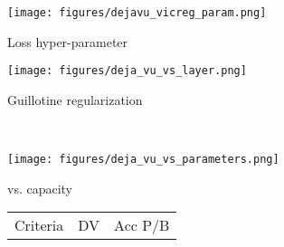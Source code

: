 \begin{figure}[ht]
\label{fig:mitigations}
\begin{minipage}[t]{0.5\textwidth}
\centering
     \begin{subfigure}[b]{0.47\textwidth}
         \centering
         \texttt{[image: figures/dejavu\_vicreg\_param.png]}
         \vspace{-1.5em}
         \caption{Loss hyper-parameter}
         \label{fig:dejavu v. invariance}
     \end{subfigure}
     \begin{subfigure}[b]{0.49\textwidth}
         \centering
         \texttt{[image: figures/deja\_vu\_vs\_layer.png]}
         \vspace{-1.5em}
         \caption{Guillotine regularization}
         \label{fig:dejavu v. guillotine}
     \end{subfigure}~
     \vspace{-0.5em}
    \caption{
    Effect of two kinds of hyper-parameters on VICReg memorization. \textbf{Left:} \dejavu score (red) versus the \emph{invariance} loss parameter, $\lambda$, used in the VICReg criterion (100k dataset). Larger $\lambda$ significantly reduces \dejavu, with minimal effect on linear probe validation performance (green). $\lambda = 25$ (near maximum \dejavu) is recommended in the original paper \textbf{Right:} \dejavu score versus projector layer---guillotine regularization \cite{Guillotine}---from projector to backbone. Removing the projector can significantly reduce \dejavu. Appendix \ref{sec:guillotine} shows that the backbone still can memorize, however; we demonstrate reconstructions using the SimCLR backbone.
    }
\end{minipage}
\hfill
\begin{minipage}[t]{0.48\textwidth}
\centering
     \begin{subfigure}[b]{0.46\textwidth}
         \centering
         \texttt{[image: figures/deja\_vu\_vs\_parameters.png]}
         \vspace{-1.3em}
         \caption{\dejavu vs. capacity}
         \label{fig:dejavu v. capacity}
     \end{subfigure}
     \hfill
     \begin{subfigure}[b]{0.52\textwidth}
          \tiny
          \centering
          \setlength{\tabcolsep}{3pt}
          \begin{tabular}{|c|c|c|}
            \hline
            Criteria & DV & Acc P/B \\

\end{tabular}
\end{subfigure}
\end{minipage}
\end{figure}
